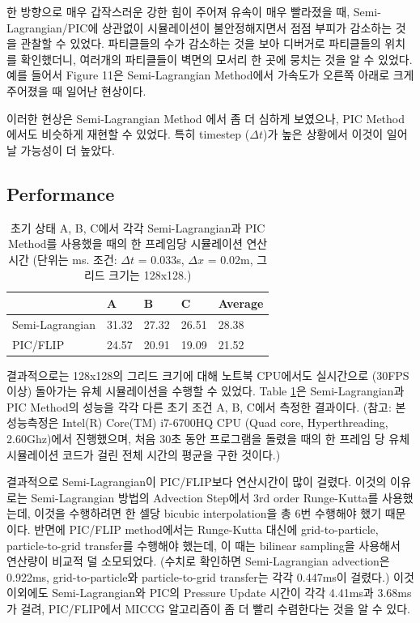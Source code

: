 \documentclass[11pt, A4]{article}
\begin{document}
한 방향으로 매우 갑작스러운 강한 힘이 주어져 유속이 매우 빨라졌을 때, Semi-Lagrangian/PIC에 상관없이 시뮬레이션이 불안정해지면서 점점 부피가 감소하는 것을 관찰할 수 있었다. 파티클들의 수가 감소하는 것을 보아 디버거로 파티클들의 위치를 확인했더니, 여러개의 파티클들이 벽면의 모서리 한 곳에 뭉치는 것을 알 수 있었다.  예를 들어서 Figure 11은 Semi-Lagrangian Method에서 가속도가 오른쪽 아래로 크게 주어졌을 때 일어난 현상이다. 

이러한 현상은 Semi-Lagrangian Method 에서 좀 더 심하게 보였으나, PIC Method에서도 비슷하게 재현할 수 있었다. 특히 timestep ($\Delta t$)가 높은 상황에서 이것이 일어날 가능성이 더 높았다.
 
\subsection{Performance}

\begin{table}[h]
\centering
\begin{tabular}{|l|l|l|l|l|}
\hline
                & A     & B     & C     & Average \\ \hline
Semi-Lagrangian & 31.32 & 27.32 & 26.51 & 28.38   \\ \hline
PIC/FLIP        & 24.57 & 20.91 & 19.09 & 21.52   \\ \hline
\end{tabular}
\caption{초기 상태 A, B, C에서 각각 Semi-Lagrangian과 PIC Method를 사용했을 때의 한 프레임당 시뮬레이션 연산 시간 (단위는 ms. 조건: $\Delta t$ = 0.033s, $\Delta x$ = 0.02m, 그리드 크기는 128x128.)}
  \label{performance}
\end{table}

결과적으로는 128x128의 그리드 크기에 대해 노트북 CPU에서도 실시간으로 (30FPS 이상) 돌아가는 유체 시뮬레이션을 수행할 수 있었다. Table \ref{performance}은 Semi-Lagrangian과 PIC Method의 성능을 각각 다른 초기 조건 A, B, C에서 측정한 결과이다. (참고: 본 성능측정은 Intel(R) Core(TM) i7-6700HQ CPU (Quad core, Hyperthreading, 2.60Ghz)에서 진행했으며, 처음 30초 동안 프로그램을 돌렸을 때의 한 프레임 당 유체 시뮬레이션 코드가 걸린 전체 시간의 평균을 구한 것이다.)

결과적으로 Semi-Lagrangian이 PIC/FLIP보다 연산시간이 많이 걸렸다. 이것의 이유로는 Semi-Lagrangian 방법의 Advection Step에서 3rd order Runge-Kutta를 사용했는데, 이것을 수행하려면 한 셀당 bicubic interpolation을 총 6번 수행해야 했기 때문이다. 반면에 PIC/FLIP method에서는 Runge-Kutta 대신에 grid-to-particle, particle-to-grid transfer를 수행해야 했는데, 이 때는 bilinear sampling을 사용해서 연산량이 비교적 덜 소모되었다. (수치로 확인하면 Semi-Lagrangian advection은 0.922ms, grid-to-particle와 particle-to-grid transfer는 각각 0.447ms이 걸렸다.) 이것 이외에도 Semi-Lagrangian와 PIC의 Pressure Update 시간이 각각 4.41ms과 3.68ms가 걸려, PIC/FLIP에서 MICCG 알고리즘이 좀 더 빨리 수렴한다는 것을 알 수 있다.
\end{document}
